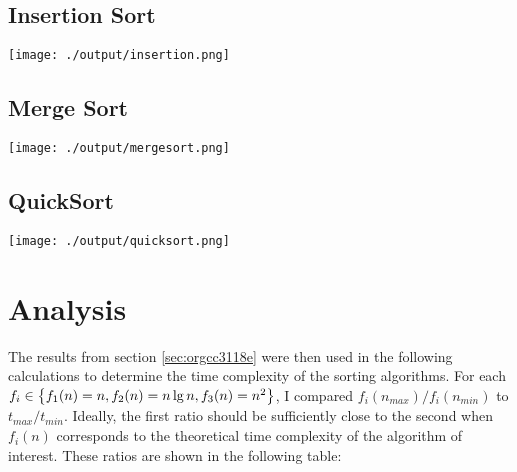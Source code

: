 \documentclass[11pt]{article}
\let\originalleft\left
\let\originalright\right
\renewcommand{\left}{\mathopen{}\mathclose\bgroup\originalleft}
\renewcommand{\right}{\aftergroup\egroup\originalright}
\begin{document}
\subsection{Insertion Sort}
\label{sec:orgec204bc}
\begin{center}
\texttt{[image: ./output/insertion.png]}
\end{center}

\subsection{Merge Sort}
\label{sec:org05d5c9a}
\begin{center}
\texttt{[image: ./output/mergesort.png]}
\end{center}

\subsection{QuickSort}
\label{sec:orgff79b59}
\begin{center}
\texttt{[image: ./output/quicksort.png]}
\end{center}

\section{Analysis}
\label{sec:orgc7fdbd9}

The results from section \ref{sec:orgcc3118e} were then used in the following calculations to determine the
time complexity of the sorting algorithms. For each
\(f_i \in \left\{ f_1(n) = n, f_2(n) = n \lg n, f_3(n) = n^2 \right\}\),
I compared \(f_i(n_{max})/f_i(n_{min})\) to \(t_{max}/t_{min}\). Ideally, the first ratio should
be sufficiently close to the second when \(f_i(n)\) corresponds to the theoretical time complexity
of the algorithm of interest. These ratios are shown in the following table:
\end{document}
